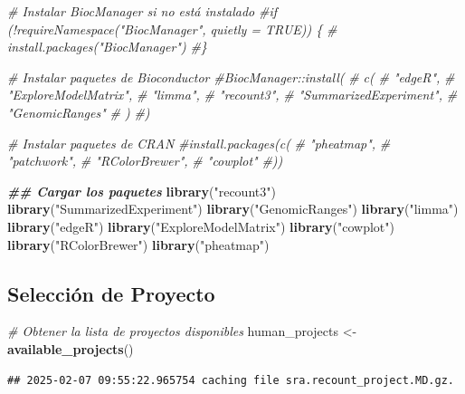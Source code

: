\documentclass[
]{article}
\newenvironment{Shaded}{\begin{snugshade}}{\end{snugshade}}
\newcommand{\CommentTok}[1]{\textcolor[rgb]{0.56,0.35,0.01}{\textit{#1}}}
\newcommand{\DocumentationTok}[1]{\textcolor[rgb]{0.56,0.35,0.01}{\textbf{\textit{#1}}}}
\newcommand{\FunctionTok}[1]{\textcolor[rgb]{0.13,0.29,0.53}{\textbf{#1}}}
\newcommand{\NormalTok}[1]{#1}
\newcommand{\OtherTok}[1]{\textcolor[rgb]{0.56,0.35,0.01}{#1}}
\newcommand{\StringTok}[1]{\textcolor[rgb]{0.31,0.60,0.02}{#1}}
\begin{document}
\begin{Shaded}
\begin{Highlighting}[]
\CommentTok{\# Instalar BiocManager si no está instalado}
\CommentTok{\#if (!requireNamespace("BiocManager", quietly = TRUE)) \{}
\CommentTok{\#    install.packages("BiocManager")}
\CommentTok{\#\}}

\CommentTok{\# Instalar paquetes de Bioconductor}
\CommentTok{\#BiocManager::install(}
\CommentTok{\#    c(}
\CommentTok{\#        "edgeR", }
\CommentTok{\#        "ExploreModelMatrix",}
\CommentTok{\#        "limma",}
\CommentTok{\#        "recount3", }
\CommentTok{\#        "SummarizedExperiment", }
\CommentTok{\#        "GenomicRanges"}
\CommentTok{\#    )}
\CommentTok{\#)}

\CommentTok{\# Instalar paquetes de CRAN}
\CommentTok{\#install.packages(c(}
\CommentTok{\#    "pheatmap", }
\CommentTok{\#    "patchwork",}
\CommentTok{\#    "RColorBrewer",}
\CommentTok{\#    "cowplot"}
\CommentTok{\#))}

\DocumentationTok{\#\# Cargar los paquetes}
\FunctionTok{library}\NormalTok{(}\StringTok{"recount3"}\NormalTok{)}
\FunctionTok{library}\NormalTok{(}\StringTok{"SummarizedExperiment"}\NormalTok{)}
\FunctionTok{library}\NormalTok{(}\StringTok{"GenomicRanges"}\NormalTok{)}
\FunctionTok{library}\NormalTok{(}\StringTok{"limma"}\NormalTok{)}
\FunctionTok{library}\NormalTok{(}\StringTok{"edgeR"}\NormalTok{)}
\FunctionTok{library}\NormalTok{(}\StringTok{"ExploreModelMatrix"}\NormalTok{)}
\FunctionTok{library}\NormalTok{(}\StringTok{"cowplot"}\NormalTok{)}
\FunctionTok{library}\NormalTok{(}\StringTok{"RColorBrewer"}\NormalTok{)}
\FunctionTok{library}\NormalTok{(}\StringTok{"pheatmap"}\NormalTok{)}
\end{Highlighting}
\end{Shaded}

\subsection{Selección de Proyecto}\label{selecciuxf3n-de-proyecto}

\begin{Shaded}
\begin{Highlighting}[]
\CommentTok{\# Obtener la lista de proyectos disponibles }
\NormalTok{human\_projects }\OtherTok{\textless{}{-}} \FunctionTok{available\_projects}\NormalTok{()}
\end{Highlighting}
\end{Shaded}

\begin{verbatim}
## 2025-02-07 09:55:22.965754 caching file sra.recount_project.MD.gz.
\end{verbatim}
\end{document}
